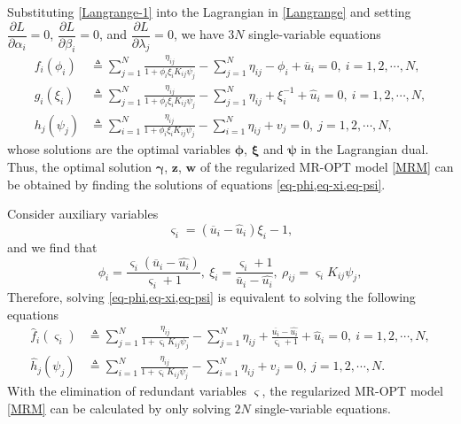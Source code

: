 \documentclass[review,hidelinks,onefignum,onetabnum]{siamart220329}
\begin{document}
Substituting \cref{Langrange-1} into the Lagrangian in
 \cref{Langrange} and setting $\dfrac{\partial L}{\partial \alpha_i}=0$, $\dfrac{\partial L}{\partial \beta_i}=0$, and $\dfrac{\partial L}{\partial \lambda_j}=0$, we have
$3N$ single-variable equations
\begin{align}
    f_i(\phi_i) &\triangleq \sum_{j=1}^{N}\frac{\eta_{ij}}{1+\phi_i \xi_i K_{ij} \psi_j}-\sum_{j=1}^{N}\eta_{ij}-\phi_i +\overline{u}_i =0, \ i=1,2,\cdots,N, \label{eq-phi} \\
    g_i(\xi_i) &\triangleq \sum_{j=1}^{N}\frac{\eta_{ij}}{1+\phi_i \xi_i K_{ij} \psi_j}-\sum_{j=1}^{N}\eta_{ij}+\xi_i^{-1} +\hat{u}_i =0, \ i=1,2,\cdots,N, \label{eq-xi} \\
    h_j(\psi_j) &\triangleq \sum_{i=1}^{N}\frac{\eta_{ij}}{1+\phi_i \xi_i K_{ij} \psi_j}-\sum_{i=1}^{N}\eta_{ij}+v_j =0, \  j=1,2,\cdots,N, \label{eq-psi}
\end{align}
whose solutions %
are the optimal variables $\bm{\phi}$, $\bm{\xi}$ and $\bm{\psi}$ in the Lagrangian dual. 
Thus, the optimal solution $\bm{\gamma}$, $\bm{z}$, $\bm{w}$ of the regularized MR-OPT model \cref{MRM} can be obtained by finding the
solutions of equations \cref{eq-phi,eq-xi,eq-psi}.



Consider auxiliary variables
\begin{equation*}
    \varsigma_i = (\overline{u}_i - \hat{u}_i ) \xi_i - 1,  
\end{equation*}
and we find that
\begin{equation*}
    \phi_i=\frac{\varsigma_i(\overline{u}_i-\hat{u_i})}{\varsigma_i+1}, \  \xi_i=\frac{\varsigma_i+1}{\overline{u}_i-\hat{u_i}}, \  \rho_{ij}=\varsigma_i K_{ij} \psi_j, 
\end{equation*}
Therefore, solving %
\cref{eq-phi,eq-xi,eq-psi} is equivalent to 
solving %
the following equations
\begin{align}
    \hat{f}_i(\varsigma_i) &\triangleq  \sum_{j=1}^{N}\frac{\eta_{ij}}{1+\varsigma_i K_{ij} \psi_j}-\sum_{j=1}^{N} \eta_{ij}+\frac{\overline{u_i}-\hat{u_i}}{\varsigma_i+1} +\hat{u}_i =0, \ i=1,2,\cdots,N, \label{eq-x} \\
    \hat{h}_j(\psi_j) &\triangleq  \sum_{i=1}^{N}\frac{\eta_{ij}}{1+\varsigma_i K_{ij} \psi_j}- \sum_{i=1}^{N} \eta_{ij}+v_j =0, \ j=1,2,\cdots,N. \label{eq-psi2}
\end{align}
With the elimination of redundant variables $\bm{\varsigma}$, the regularized MR-OPT model \cref{MRM} can be calculated by only solving $2N$ single-variable equations.
\end{document}
